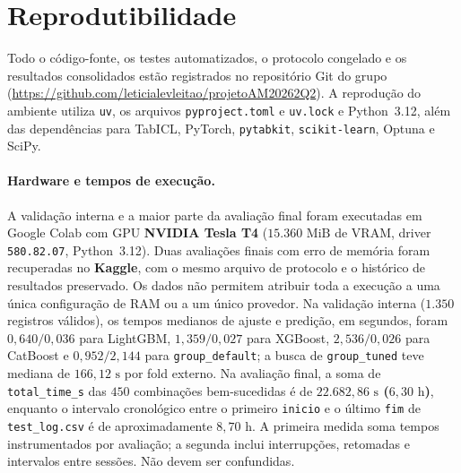 \documentclass[11pt,a4paper]{article}
\begin{document}
\section{Reprodutibilidade}
\label{sec:reprodutibilidade}

Todo o código-fonte, os testes automatizados, o protocolo congelado e os resultados consolidados estão registrados no repositório Git do grupo (\url{https://github.com/leticialevleitao/projetoAM20262Q2}). A reprodução do ambiente utiliza \texttt{uv}, os arquivos \texttt{pyproject.toml} e \texttt{uv.lock} e Python~3.12, além das dependências para TabICL, PyTorch, \texttt{pytabkit}, \texttt{scikit-learn}, Optuna e SciPy.

\paragraph{Hardware e tempos de execução.}
A validação interna e a maior parte da avaliação final foram executadas em Google Colab com GPU \textbf{NVIDIA Tesla T4} ($15.360\text{ MiB}$ de VRAM, driver \texttt{580.82.07}, Python~3.12). Duas avaliações finais com erro de memória foram recuperadas no \textbf{Kaggle}, com o mesmo arquivo de protocolo e o histórico de resultados preservado. Os dados não permitem atribuir toda a execução a uma única configuração de RAM ou a um único provedor. Na validação interna ($1.350$ registros válidos), os tempos medianos de ajuste e predição, em segundos, foram $0{,}640/0{,}036$ para LightGBM, $1{,}359/0{,}027$ para XGBoost, $2{,}536/0{,}026$ para CatBoost e $0{,}952/2{,}144$ para \texttt{group\_default}; a busca de \texttt{group\_tuned} teve mediana de $166{,}12\text{ s}$ por fold externo. Na avaliação final, a soma de \texttt{total\_time\_s} das $450$ combinações bem-sucedidas é de \textbf{$22.682{,}86\text{ s}$ ($6{,}30\text{ h}$)}, enquanto o intervalo cronológico entre o primeiro \texttt{inicio} e o último \texttt{fim} de \texttt{test\_log.csv} é de aproximadamente \textbf{$8{,}70\text{ h}$}. A primeira medida soma tempos instrumentados por avaliação; a segunda inclui interrupções, retomadas e intervalos entre sessões. Não devem ser confundidas.
\end{document}
